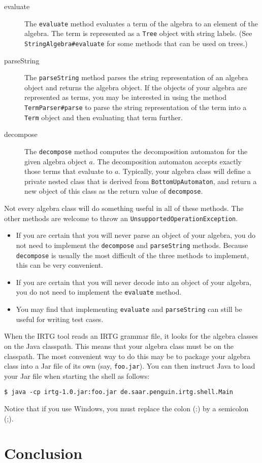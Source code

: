 \documentclass[11pt]{article}
\begin{document}
\begin{description}
\item[evaluate] The \verb?evaluate? method evaluates a term of the
  algebra to an element of the algebra. The term is represented as a
  \verb?Tree? object with string labels. (See
  \verb?StringAlgebra#evaluate? for some methods that can be used on
  trees.)
\item[parseString] The \verb?parseString? method parses the string
  representation of an algebra object and returns the algebra
  object. If the objects of your algebra are represented as terms, you
  may be interested in using the method \verb?TermParser#parse? to
  parse the string representation of the term into a \verb?Term?
  object and then evaluating that term further.
\item[decompose] The \verb?decompose? method computes the
  decomposition automaton for the given algebra object $a$. The
  decomposition automaton accepts exactly those terms that evaluate to
  $a$. Typically, your algebra class will define a private nested
  class that is derived from \verb?BottomUpAutomaton?, and return a
  new object of this class as the return value of \verb?decompose?.
\end{description}

Not every algebra class will do something useful in all of these
methods. The other methods are welcome to throw an
\verb?UnsupportedOperationException?.

\begin{itemize}
\item If you are certain that you will never parse an object of your
  algebra, you do not need to implement the \verb?decompose? and
  \verb?parseString?  methods. Because \verb?decompose? is usually the
  most difficult of the three methods to implement, this can be very
  convenient.
\item If you are certain that you will never decode into an object of
  your algebra, you do not need to implement the \verb?evaluate?
  method.
\item You may find that implementing \verb?evaluate? and
  \verb?parseString? can still be useful for writing test cases.
\end{itemize}

When the IRTG tool reads an IRTG grammar file, it looks for the
algebra classes on the Java classpath. This means that your algebra
class must be on the classpath. The most convenient way to do this may
be to package your algebra class into a Jar file of its own (say,
\verb?foo.jar?). You can then instruct Java to load your Jar file when
starting the shell as follows:

\begin{verbatim}
$ java -cp irtg-1.0.jar:foo.jar de.saar.penguin.irtg.shell.Main
\end{verbatim}

Notice that if you use Windows, you must replace the colon (:) by a
semicolon (;).


\section{Conclusion} \label{sec:conclusion}





\end{document}
